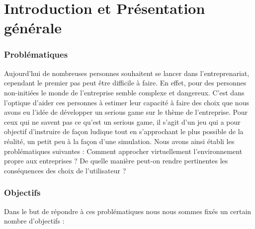 

\part{Introduction et Présentation générale}

\setcounter{section}{0}

\section{Problématiques}



Aujourd’hui de nombreuses personnes souhaitent se lancer dans l’entreprenariat, cependant le premier pas peut être difficile à faire. En effet, pour des personnes non-initiées
le monde de l’entreprise semble complexe et dangereux. C’est dans l’optique d’aider ces
personnes à estimer leur capacité à faire des choix que nous avons eu l’idée de développer un serious game sur le thème de l'entreprise. Pour ceux qui ne savent pas ce qu'est un serious game, il s'agit d'un jeu qui a pour objectif d'instruire de façon ludique tout en s'approchant le plus possible de la réalité, un petit peu à la façon d'une simulation. Nous avons ainsi établi les problématiques suivantes :
Comment approcher virtuellement l’environnement propre aux entreprises ?
De quelle manière peut-on rendre pertinentes les conséquences des choix de l’utilisateur ?



\section{Objectifs}



Dans le but de répondre à ces problématiques nous nous sommes fixés un certain
nombre d’objectifs :



